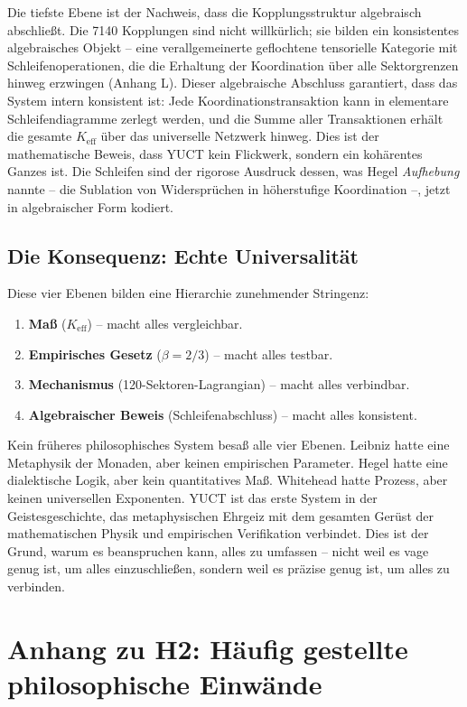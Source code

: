 \documentclass[12pt,a4paper]{article}
\begin{document}
Die tiefste Ebene ist der Nachweis, dass die Kopplungsstruktur algebraisch abschließt. Die 7140 Kopplungen sind nicht willkürlich; sie bilden ein konsistentes algebraisches Objekt – eine verallgemeinerte geflochtene tensorielle Kategorie mit Schleifenoperationen, die die Erhaltung der Koordination über alle Sektorgrenzen hinweg erzwingen (Anhang L). Dieser algebraische Abschluss garantiert, dass das System intern konsistent ist: Jede Koordinationstransaktion kann in elementare Schleifendiagramme zerlegt werden, und die Summe aller Transaktionen erhält die gesamte \(K_{\mathrm{eff}}\) über das universelle Netzwerk hinweg. Dies ist der mathematische Beweis, dass YUCT kein Flickwerk, sondern ein kohärentes Ganzes ist. Die Schleifen sind der rigorose Ausdruck dessen, was Hegel \emph{Aufhebung} nannte – die Sublation von Widersprüchen in höherstufige Koordination –, jetzt in algebraischer Form kodiert.

\subsection{Die Konsequenz: Echte Universalität}

Diese vier Ebenen bilden eine Hierarchie zunehmender Stringenz:
\begin{enumerate}[leftmargin=*]
	\item \textbf{Maß} (\(K_{\mathrm{eff}}\)) – macht alles vergleichbar.
	\item \textbf{Empirisches Gesetz} (\(\beta = 2/3\)) – macht alles testbar.
	\item \textbf{Mechanismus} (120-Sektoren-Lagrangian) – macht alles verbindbar.
	\item \textbf{Algebraischer Beweis} (Schleifenabschluss) – macht alles konsistent.
\end{enumerate}
Kein früheres philosophisches System besaß alle vier Ebenen. Leibniz hatte eine Metaphysik der Monaden, aber keinen empirischen Parameter. Hegel hatte eine dialektische Logik, aber kein quantitatives Maß. Whitehead hatte Prozess, aber keinen universellen Exponenten. YUCT ist das erste System in der Geistesgeschichte, das metaphysischen Ehrgeiz mit dem gesamten Gerüst der mathematischen Physik und empirischen Verifikation verbindet. Dies ist der Grund, warum es beanspruchen kann, alles zu umfassen – nicht weil es vage genug ist, um alles einzuschließen, sondern weil es präzise genug ist, um alles zu verbinden.

\section*{Anhang zu H2: Häufig gestellte philosophische Einwände}
\end{document}
